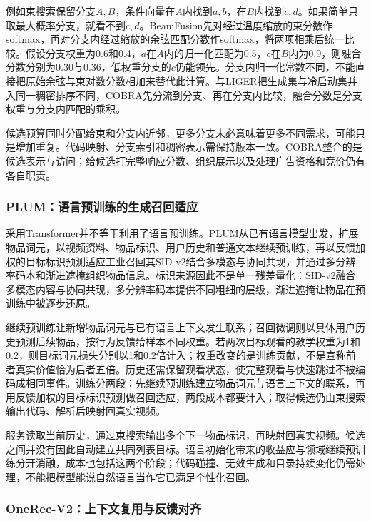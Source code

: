 例如束搜索保留分支$A,B$，条件向量在$A$内找到$a,b$，在$B$内找到$c,d$。如果简单只取最大概率分支，就看不到$c,d$。BeamFusion先对经过温度缩放的束分数作softmax，再对分支内经过缩放的余弦匹配分数作softmax，将两项相乘后统一比较。假设分支权重为0.6和0.4，$a$在$A$内的归一化匹配为0.5，$c$在$B$内为0.9，则融合分数分别为0.30与0.36，低权重分支的$c$仍能领先。分支内归一化常数不同，不能直接把原始余弦与束对数分数相加来替代此计算。与LIGER把生成集与冷启动集并入同一稠密排序不同，COBRA先分流到分支、再在分支内比较，融合分数是分支权重与分支内匹配的乘积。

候选预算同时分配给束和分支内近邻，更多分支未必意味着更多不同需求，可能只是增加重复。代码映射、分支索引和稠密表示需保持版本一致。COBRA整合的是候选表示与访问；给候选打完整响应分数、组织展示以及处理广告资格和竞价仍有各自职责。

\Needspace{120mm}
\subsubsection{PLUM：语言预训练的生成召回适应}
\label{sec:rs-plum}

采用Transformer并不等于利用了语言预训练。PLUM从已有语言模型出发，扩展物品词元，以视频资料、物品标识、用户历史和普通文本继续预训练，再以反馈加权的目标标识预测适应工业召回其SID-v2结合多模态与协同共现，并通过多分辨率码本和渐进遮掩组织物品信息。标识来源因此不是单一残差量化：SID-v2融合多模态内容与协同共现，多分辨率码本提供不同粗细的层级，渐进遮掩让物品在预训练中被逐步还原。

继续预训练让新增物品词元与已有语言上下文发生联系；召回微调则以具体用户历史预测后续物品，按行为反馈给样本不同权重。若两次目标观看的教学权重为1和0.2，则目标词元损失分别以1和0.2倍计入；权重改变的是训练贡献，不是宣称前者真实价值恰为后者五倍。历史还需保留观看状态，使完整观看与快速跳过不被编码成相同事件。训练分两段：先继续预训练建立物品词元与语言上下文的联系，再用反馈加权的目标标识预测做召回适应，两段成本都要计入；取得候选仍由束搜索输出代码、解析后映射回真实视频。

服务读取当前历史，通过束搜索输出多个下一物品标识，再映射回真实视频。候选之间并没有因此自动建立共同列表目标。语言初始化带来的收益应与领域继续预训练分开消融，成本也包括这两个阶段；代码碰撞、无效生成和目录持续变化仍需处理，不能把模型能说自然语言当作它已满足个性化召回。

\Needspace{145mm}
\subsubsection{OneRec-V2：上下文复用与反馈对齐}
\label{sec:rs-onerec-v2}

